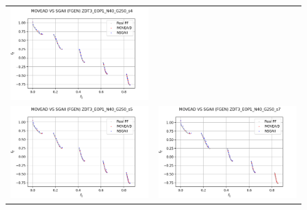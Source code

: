 \begin{figure}[H]
\begin{tabular}{c c}
    \includegraphics[scale=0.5]{figures/ZDT3_EOP1_N40_G250_T6/s4_comp.png}\\
    \includegraphics[scale=0.5]{figures/ZDT3_EOP1_N40_G250_T6/s5_comp.png} &
    \includegraphics[scale=0.5]{figures/ZDT3_EOP1_N40_G250_T6/s7_comp.png}\\

\end{tabular}
\end{figure}
